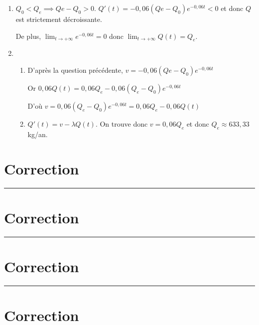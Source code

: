 \documentclass[12pt,a4paper,french]{article}
\theoremstyle{break}
\theoremstyle{plain}
\theoremstyle{nonumberplain}
\theoremstyle{nonumberbreak}
\begin{document}
\begin{solution}
  \begin{enumerate}
    \item $Q_0 < Q_e \implies Qe - Q_0 > 0$. $Q'(t) = -0,06(Qe -
      Q_0)e^{-0,06t} < 0$ et donc $Q$ est strictement décroissante.

      De plus, $\lim_{t\to+\infty} e^{-0,06t} = 0$ donc
      $\lim_{t\to+\infty} Q(t) = Q_e$.

    \item
      \begin{enumerate}
        \item D'après la question précédente, $v = -0,06(Qe -
          Q_0)e^{-0,06t}$

          Or $0,06Q(t) = 0,06Q_e -0,06(Q_e-Q_0)e^{-0,06t}$

          D'où $v = 0,06(Q_e-Q_0)e^{-0,06t} = 0,06Q_e - 0,06Q(t)$

    \item $Q'(t) = v - \lambda Q(t)$. On trouve donc $v = 0,06 Q_e$ et
      donc $Q_e \approx 633,33$ kg/an.
  \end{enumerate}
  \end{enumerate}
\end{solution}

\newpage
\section*{Correction}
\printsolutions
\vfill
\hrule
\vfill
\section*{Correction}
\printsolutions
\vfill
\hrule
\vfill
\section*{Correction}
\printsolutions
\vfill
\hrule
\vfill
\section*{Correction}
\printsolutions
\end{document}
